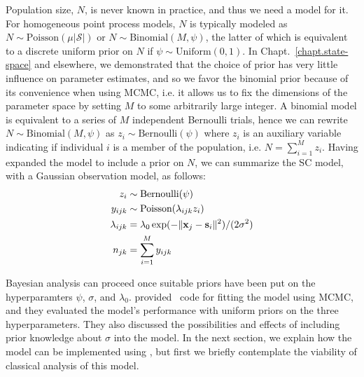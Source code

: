 Population size, $N$, is never known in practice, and thus %
we need a model for it. For homogeneous point process models,
$N$ is typically modeled as
$N \sim \text{Poisson}(\mu|\mathcal{S}|)$ or
$N \sim \text{Binomial}(M, \psi)$, the latter of which is equivalent
to a discrete uniform prior on $N$ if $\psi \sim \text{Uniform}(0,1)$. In
Chapt.~\ref{chapt.state-space} and elsewhere, we demonstrated that
the choice of prior has very little influence on parameter estimates,
and so we favor the binomial prior because of its convenience when
using MCMC, i.e. it allows us to fix the
dimensions of the parameter space by setting $M$ to some arbitrarily
large integer.
A binomial model is
equivalent to a series of $M$ independent Bernoulli trials, hence
we can rewrite $N \sim \text{Binomial}(M, \psi)$ as $z_i \sim
\text{Bernoulli}(\psi)$ where $z_i$ is an auxiliary variable
indicating if individual $i$ is a member of the population, i.e. $N =
\sum_{i=1}^M z_i$. Having expanded the model to include a prior on $N$, we
can summarize the SC model, with a Gaussian observation model, as follows:
\begin{align*}
  z_i &\sim \text{Bernoulli}(\psi) \\
  y_{ijk} &\sim \text{Poisson}(\lambda_{ijk} z_i) \\
  \lambda_{ijk} &= \lambda_0\exp(-\|{\bf x}_j - {\bf s}_i\|^2)/(2\sigma^2) \\
  n_{jk} &= \sum_{i=1}^M y_{ijk} %
\end{align*}




Bayesian analysis can proceed once suitable priors have been put on
the hyperparamters $\psi$, $\sigma$, and
$\lambda_0$. \citet{chandler_royle:2012} provided \R~code for fitting
the model using MCMC, and they evaluated the model's performance with
uniform priors on the three hyperparameters. They also discussed the
possibilities and effects of including prior knowledge about $\sigma$
into the model. In the next section, we explain how the model can be
implemented using \jags, but first we briefly contemplate the viability of classical
analysis of this model.

